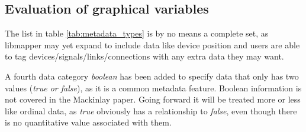 \subsection{Evaluation of graphical variables}

The list in table \ref{tab:metadata_types} is by no means a complete set, as libmapper may yet expand to include data like device position and users are able to tag devices/signals/links/connections with any extra data they may want.

A fourth data category \emph{boolean} has been added to specify data that only has two values (\emph{true or false}), as it is a common metadata feature. Boolean information is not covered in the Mackinlay paper. Going forward it will be treated more or less like ordinal data, as \emph{true} obviously has a relationship to \emph{false}, even though there is no quantitative value associated with them.


